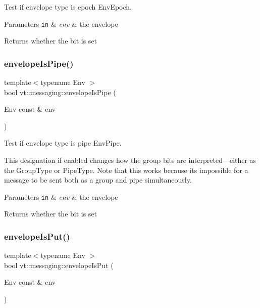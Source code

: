Test if envelope type is epoch {\ttfamily Env\+Epoch}. 


\begin{DoxyParams}[1]{Parameters}
\mbox{\tt in}  & {\em env} & the envelope\\
\hline
\end{DoxyParams}
\begin{DoxyReturn}{Returns}
whether the bit is set 
\end{DoxyReturn}
\mbox{\label{namespacevt_1_1messaging_af97867f7e468ce73a69cd228404c47b0}} 
\subsubsection{\texorpdfstring{envelope\+Is\+Pipe()}{envelopeIsPipe()}}
{\footnotesize\ttfamily template$<$typename Env $>$ \\
bool vt\+::messaging\+::envelope\+Is\+Pipe (\begin{DoxyParamCaption}\item[{Env const \&}]{env }\end{DoxyParamCaption})\hspace{0.3cm}{\ttfamily [inline]}}



Test if envelope type is pipe {\ttfamily Env\+Pipe}. 

This designation if enabled changes how the group bits are interpreted---either as the {\ttfamily Group\+Type} or {\ttfamily Pipe\+Type}. Note that this works because its impossible for a message to be sent both as a group and pipe simultaneously.


\begin{DoxyParams}[1]{Parameters}
\mbox{\tt in}  & {\em env} & the envelope\\
\hline
\end{DoxyParams}
\begin{DoxyReturn}{Returns}
whether the bit is set 
\end{DoxyReturn}
\mbox{\label{namespacevt_1_1messaging_a0a46a75d45e4f2ad55df0f8b2c2a5f2b}} 
\subsubsection{\texorpdfstring{envelope\+Is\+Put()}{envelopeIsPut()}}
{\footnotesize\ttfamily template$<$typename Env $>$ \\
bool vt\+::messaging\+::envelope\+Is\+Put (\begin{DoxyParamCaption}\item[{Env const \&}]{env }\end{DoxyParamCaption})\hspace{0.3cm}{\ttfamily [inline]}}



